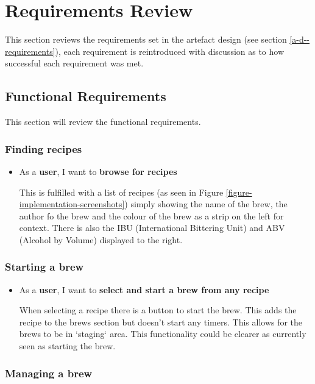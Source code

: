 \section{Requirements Review} \label{t-e--requirements-review}

This section reviews the requirements set in the artefact design (see section \ref{a-d--requirements}), each requirement is reintroduced with discussion as to how successful each requirement was met.

\subsection{Functional Requirements} \label{t-e--requirements--functional}

This section will review the functional requirements.

\subsubsection{Finding recipes}

\begin{itemize}
  \item As a \textbf{user}, I want to \textbf{browse for recipes}

  This is fulfilled with a list of recipes (as seen in Figure \ref{figure-implementation-screenshots}) simply showing the name of the brew, the author fo the brew and the colour of the brew as a strip on the left for context. There is also the IBU (International Bittering Unit) and ABV (Alcohol by Volume) displayed to the right.

\end{itemize}

\subsubsection{Starting a brew}

\begin{itemize}
  \item As a \textbf{user}, I want to \textbf{select and start a brew from any recipe}

  When selecting a recipe there is a button to start the brew. This adds the recipe to the brews section but doesn't start any timers. This allows for the brews to be in `staging` area. This functionality could be clearer as currently seen as starting the brew.
\end{itemize}

\subsubsection{Managing a brew}

